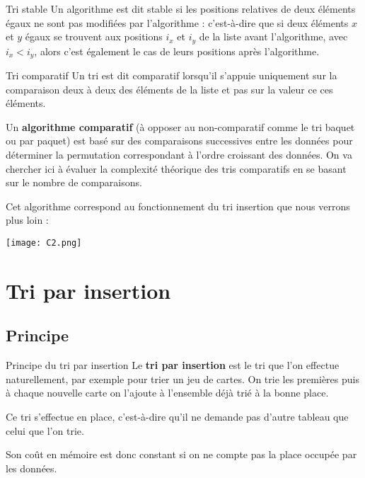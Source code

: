 \begin{defi}{Tri stable} 
Un algorithme est dit stable si les positions relatives de deux éléments égaux ne sont pas
modifiées par l'algorithme : c'est-à-dire que si deux éléments $x$ et $y$ égaux se trouvent aux positions $i_x$ et $i_y$ de
la liste avant l'algorithme, avec $i_x < i_y$, alors c'est également le cas de leurs positions après l'algorithme.
\end{defi}

\begin{defi}{Tri comparatif}
Un tri est dit comparatif lorsqu'il s'appuie uniquement sur la comparaison deux à deux des éléments de la liste et pas sur la valeur ce ces éléments.
\end{defi}



\begin{exemple}%

Un \textbf{algorithme comparatif} (à opposer au non-comparatif comme le tri baquet ou par paquet) est basé sur des comparaisons successives entre les données pour déterminer la permutation correspondant à l'ordre croissant des données.
On va chercher ici à évaluer la complexité théorique des tris comparatifs en se basant sur le nombre de comparaisons.

Cet algorithme correspond au fonctionnement du tri insertion que nous verrons plus loin :

\begin{center}
\texttt{[image: C2.png]}
\end{center}

\end{exemple}

\section{Tri par insertion}
\subsection{Principe}

\begin{defi}{Principe du tri par insertion}
Le \textbf{tri par insertion} est le tri que l'on effectue naturellement, par exemple pour trier un jeu de cartes. On trie les premières puis à chaque nouvelle carte on l'ajoute à l'ensemble déjà trié à la bonne place. 

Ce tri s'effectue en place, c'est-à-dire qu'il ne demande pas d'autre tableau que celui que l'on trie. 

Son coût en mémoire est donc constant si on ne compte pas la place occupée par les données.
\end{defi}



